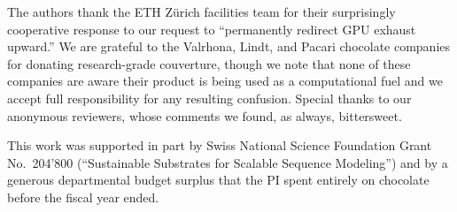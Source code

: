 \documentclass[11pt,a4paper]{article}
\begin{document}
The authors thank the ETH Zürich facilities team for their surprisingly cooperative response to our request to ``permanently redirect GPU exhaust upward.'' We are grateful to the Valrhona, Lindt, and Pacari chocolate companies for donating research-grade couverture, though we note that none of these companies are aware their product is being used as a computational fuel and we accept full responsibility for any resulting confusion. Special thanks to our anonymous reviewers, whose comments we found, as always, bittersweet.

This work was supported in part by Swiss National Science Foundation Grant No.\ 204'800 (``Sustainable Substrates for Scalable Sequence Modeling'') and by a generous departmental budget surplus that the PI spent entirely on chocolate before the fiscal year ended.
\end{document}

